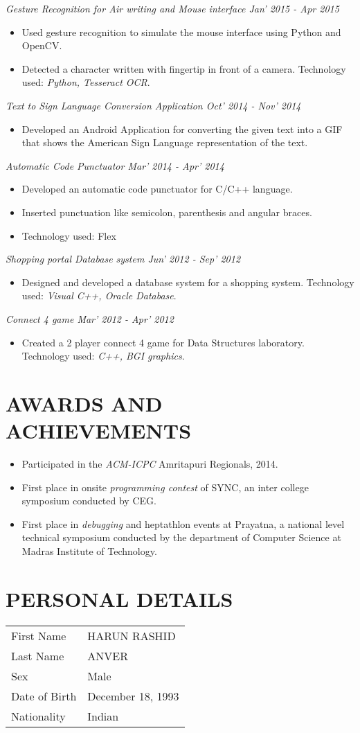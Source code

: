 \documentclass{article}
\begin{document}
\textit{Gesture Recognition for Air writing and Mouse interface \hfill Jan' 2015 - Apr 2015}
\begin{itemize}
	\item Used gesture recognition to simulate the mouse interface using Python and OpenCV.
	\item Detected a character written with fingertip in front of a camera. Technology used: \textit{Python, Tesseract OCR}.
\end{itemize}
\textit{Text to Sign Language Conversion Application \hfill Oct' 2014 - Nov' 2014}
\begin{itemize}
	\item Developed an Android Application for converting the given text into a GIF that shows the American Sign Language representation of the text.
\end{itemize}
\textit{Automatic Code Punctuator \hfill Mar' 2014 - Apr' 2014}
\begin{itemize}
	\item Developed an automatic code punctuator for C/C++ language.
	\item Inserted punctuation like semicolon, parenthesis and angular braces.
	\item Technology used: Flex
\end{itemize}
\textit{Shopping portal Database system \hfill Jun' 2012 - Sep' 2012}
\begin{itemize}
	\item Designed and developed a database system for a shopping system. Technology used: \textit{Visual C++, Oracle Database}.
\end{itemize}
\textit{Connect 4 game \hfill Mar' 2012 - Apr' 2012}
\begin{itemize}
	\item Created a 2 player connect 4 game for Data Structures laboratory. Technology used: \textit{C++, BGI graphics}.
\end{itemize}

\section*{AWARDS AND ACHIEVEMENTS}
\begin{itemize}
	\item Participated in the \textit{ACM-ICPC} Amritapuri Regionals, 2014.
	\item First place in onsite \textit{programming contest} of SYNC, an inter college symposium conducted by CEG.
	\item First place in \textit{debugging} and heptathlon events at Prayatna, a national level technical symposium conducted by the department of Computer Science at Madras Institute of Technology.
\end{itemize}

\section*{PERSONAL DETAILS}

\begin{tabular}{l l}
  First Name & HARUN RASHID \\
  Last Name & ANVER \\
  Sex & Male \\
  Date of Birth & December 18, 1993 \\
  Nationality & Indian \\
\end{tabular}
\end{document}
